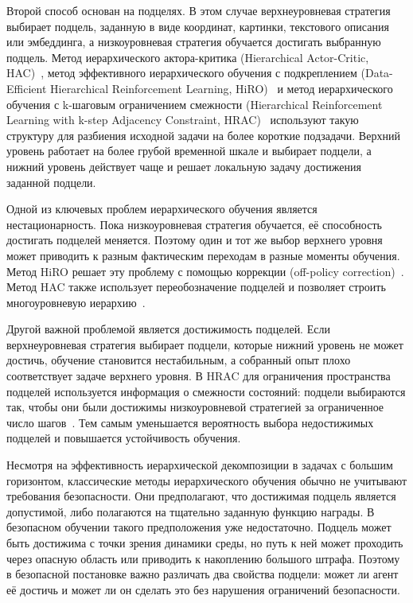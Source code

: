 Второй способ основан на подцелях. В этом случае верхнеуровневая стратегия выбирает подцель, заданную в виде координат, картинки, текстового описания или эмбеддинга, а низкоуровневая стратегия обучается достигать выбранную подцель. Метод иерархического актора-критика (Hierarchical Actor-Critic, HAC)~\cite{levy2017hierarchical}, метод эффективного иерархического обучения с подкреплением (Data-Efficient Hierarchical Reinforcement Learning, HiRO)~\cite{nachum2018data} и метод иерархического обучения с k-шаговым ограничением смежности (Hierarchical Reinforcement Learning with k-step Adjacency Constraint, HRAC)~\cite{hrac} используют такую структуру для разбиения исходной задачи на более короткие подзадачи. Верхний уровень работает на более грубой временной шкале и выбирает подцели, а нижний уровень действует чаще и решает локальную задачу достижения заданной подцели.

Одной из ключевых проблем иерархического обучения является нестационарность. Пока низкоуровневая стратегия обучается, её способность достигать подцелей меняется. Поэтому один и тот же выбор верхнего уровня может приводить к разным фактическим переходам в разные моменты обучения. Метод HiRO решает эту проблему с помощью коррекции (off-policy correction)~\cite{nachum2018data}. Метод HAC также использует переобозначение подцелей и позволяет строить многоуровневую иерархию~\cite{levy2017hierarchical}.

Другой важной проблемой является достижимость подцелей. Если верхнеуровневая стратегия выбирает подцели, которые нижний уровень не может достичь, обучение становится нестабильным, а собранный опыт плохо соответствует задаче верхнего уровня. В HRAC для ограничения пространства подцелей используется информация о смежности состояний: подцели выбираются так, чтобы они были достижимы низкоуровневой стратегией за ограниченное число шагов~\cite{hrac}. Тем самым уменьшается вероятность выбора недостижимых подцелей и повышается устойчивость обучения.

Несмотря на эффективность иерархической декомпозиции в задачах с большим горизонтом, классические методы иерархического обучения обычно не учитывают требования безопасности. Они предполагают, что достижимая подцель является допустимой, либо полагаются на тщательно заданную функцию награды. В безопасном обучении такого предположения уже недостаточно. Подцель может быть достижима с точки зрения динамики среды, но путь к ней может проходить через опасную область или приводить к накоплению большого штрафа. Поэтому в безопасной постановке важно различать два свойства подцели: может ли агент её достичь и может ли он сделать это без нарушения ограничений безопасности.

